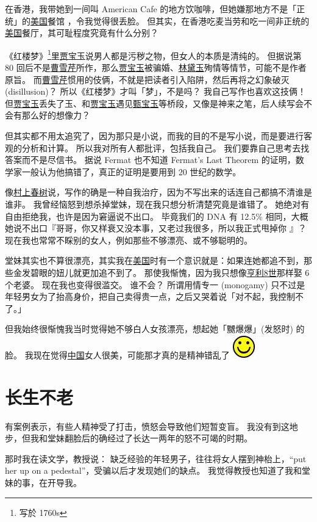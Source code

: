 \documentclass[12pt]{report}
\newcommand*\smiley{\includegraphics[scale=0.5]{smiley.jpg}}
\begin{document}
在香港，我带她到一间叫 American Cafe 的地方饮咖啡，但她嫌那地方不是「正统」的\underline{美国}餐馆 ，令我觉得很丢脸。 但其实，在香港吃麦当劳和吃一间非正统的\underline{美国}餐厅，其可耻程度究竟有什么分别？

《红楼梦》\footnote{写於 1760s}里\underline{贾宝玉}说男人都是污秽之物，但女人的本质是清纯的。 但据说第 80 回后不是\underline{曹雪芹}所作，那么\underline{贾宝玉}被骗婚、\underline{林黛玉}殉情等情节，可能不是作者原旨。 而\underline{曹雪芹}惯用的伎俩，不就是把读者引入陷阱，然后再将之幻象破灭 (disillusion)？ 所以《红楼梦》才叫「梦」，不是吗？ 我自己写作也喜欢这技俩！ 但\underline{贾宝玉}丢失了玉、和\underline{贾宝玉}遇见\underline{甄宝玉}等桥段，又像是神来之笔，后人续写会不会有那么好的想像力？

但其实都不用太追究了，因为那只是小说，而我的目的不是写小说，而是要进行客观的分析和计算。 所以我对所有人都批评，包括我自己。 我们要靠自己思考去找答案而不是尽信书。 据说 Fermat 也不知道 Fermat's Last Theorem 的证明，数学家一般认为他搞错了，真正的证明是要用到 20 世纪的数学。

像\underline{村上春树}说，写作的确是一种自我治疗，因为不写出来的话连自己都搞不清谁是谁非。 我曾经恼怒到想杀掉堂妹，现在我只想分析清楚究竟是谁错了。 她绝对有自由拒绝我，也许是因为窘逼说不出口。 毕竟我们的 DNA 有 12.5\% 相同，大概她说不出口『哥哥，你又样衰又没本事，又老过我很多，所以我正式甩掉你 』？ 现在我也常常不睬别的女人，例如那些不够漂亮、或不够聪明的。

堂妹其实也不算很漂亮，其实我在\underline{美国}时有一个意识就是：如果连她都追不到，那些金发碧眼的妞儿就更加追不到了。 那使我惭愧，因为我只想像\underline{亨利8世}那样娶 6 个老婆。 现在我也变得很滥交。 谁不会？  所谓用情专一 (monogamy) 只不过是年轻男女为了抬高身价，把自己卖得贵一点，之后又哭着说「对不起，我控制不了。」

但我始终很惭愧我当时觉得她不够白人女孩漂亮，想起她「嬲爆爆」(发怒时) 的脸。 我现在觉得\underline{中国}女人很美，可能那才真的是精神错乱了 \smiley

\chapter{长生不老}

有案例表示，有些人精神受了打击，愤怒会导致他们短暂变盲。 我没有到这地步，但我和堂妹翻脸后的确经过了长达一两年的怒不可竭的时期。

那时我在读文学，教授说： 缺乏经验的年轻男子，往往将女人摆到神枱上，``put her up on a pedestal''，受骗以后才发现她们的缺点。  我觉得教授也知道了我和堂妹的事，在开导我。
\end{document}
